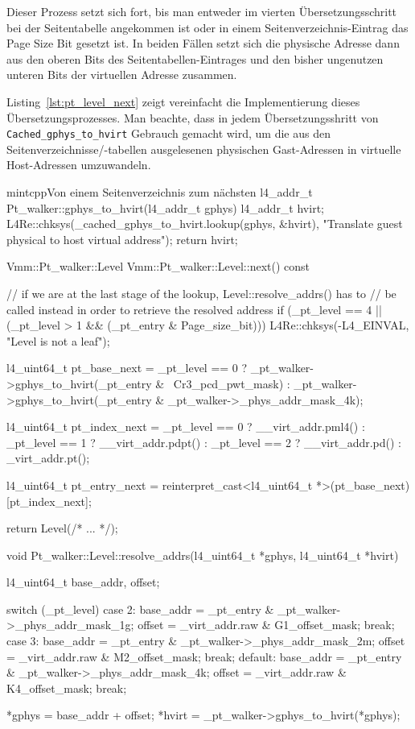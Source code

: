 Dieser Prozess setzt sich fort, bis man entweder im vierten Übersetzungsschritt
bei der Seitentabelle angekommen ist oder in einem Seitenverzeichnis-Eintrag
das Page Size Bit gesetzt ist. In beiden Fällen setzt sich die physische
Adresse dann aus den oberen Bits des Seitentabellen-Eintrages und den bisher
ungenutzen unteren Bits der virtuellen Adresse zusammen.

Listing~\ref{lst:pt_level_next} zeigt vereinfacht die Implementierung dieses
Übersetzungsprozesses. Man beachte, dass in jedem Übersetzungsshritt von
\texttt{Cached\_gphys\_to\_hvirt} Gebrauch gemacht wird, um die aus den
Seitenverzeichnisse/-tabellen ausgelesenen physischen Gast-Adressen in
virtuelle Host-Adressen umzuwandeln.

\begin{mintlisting}[label=lst:pt_level_next]{mintcpp}{Von einem Seitenverzeichnis zum nächsten}
l4_addr_t Pt_walker::gphys_to_hvirt(l4_addr_t gphys)
{
  l4_addr_t hvirt;
  L4Re::chksys(_cached_gphys_to_hvirt.lookup(gphys, &hvirt),
               "Translate guest physical to host virtual address");
  return hvirt;
}

Vmm::Pt_walker::Level Vmm::Pt_walker::Level::next() const
{
  // if we are at the last stage of the lookup, Level::resolve_addrs() has to
  // be called instead in order to retrieve the resolved address
  if (_pt_level == 4 || (_pt_level > 1 && (_pt_entry & Page_size_bit)))
    L4Re::chksys(-L4_EINVAL, "Level is not a leaf");

  l4_uint64_t pt_base_next =
    _pt_level == 0 ? _pt_walker->gphys_to_hvirt(_pt_entry & ~Cr3_pcd_pwt_mask) :
    _pt_walker->gphys_to_hvirt(_pt_entry & _pt_walker->_phys_addr_mask_4k);

  l4_uint64_t pt_index_next =
     _pt_level == 0 ? __virt_addr.pml4() :
     _pt_level == 1 ? __virt_addr.pdpt() :
     _pt_level == 2 ? __virt_addr.pd() :
     _virt_addr.pt();

  l4_uint64_t pt_entry_next = reinterpret_cast<l4_uint64_t *>(pt_base_next)[pt_index_next];

  return Level(/* ... */);
}

void Pt_walker::Level::resolve_addrs(l4_uint64_t *gphys, l4_uint64_t *hvirt)
{
  l4_uint64_t base_addr, offset;

  switch (_pt_level)
    {
    case 2:
      base_addr = _pt_entry & _pt_walker->_phys_addr_mask_1g;
      offset = _virt_addr.raw & G1_offset_mask;
      break;
    case 3:
      base_addr = _pt_entry & _pt_walker->_phys_addr_mask_2m;
      offset = _virt_addr.raw & M2_offset_mask;
      break;
    default:
      base_addr = _pt_entry & _pt_walker->_phys_addr_mask_4k;
      offset = _virt_addr.raw & K4_offset_mask;
      break;
    }

  *gphys = base_addr + offset;
  *hvirt = _pt_walker->gphys_to_hvirt(*gphys);
}
\end{mintlisting}

